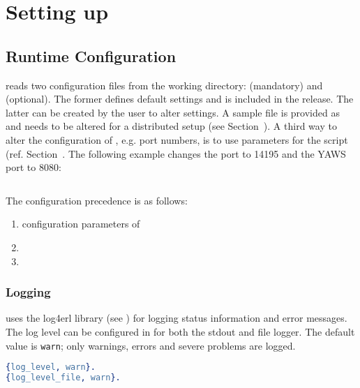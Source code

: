\chapter{Setting up \scalaris{}}
\label{chapter.runscalaris}

\section{Runtime Configuration}
\label{chapter.runscalaris.runtime_config}

\scalaris{} reads two configuration files from the working directory:
 (mandatory) and 
(optional). The former defines default settings and is included in the
release. The latter can be created by the user to alter settings.
A sample file is provided as 
and needs to be altered for a distributed setup (see
Section~).
A third way to alter the configuration of \scalaris{}, e.g. port numbers,
is to use parameters for the  script
(ref. Section~. The following
example changes the port to 14195 and the YAWS port to 8080:

\begin{lstlisting}[language=sh]
%> ./bin/scalarisctl -p 14194 -y 8080
\end{lstlisting}

The configuration precedence is as follows:
\begin{enumerate}
  \item configuration parameters of 
  \item {}
  \item {}
\end{enumerate}


\subsection{Logging}
\label{sec:logging}

\scalaris{} uses the log4erl library (see ) for
logging status information and error messages. The log level can be
configured in  for both the stdout and file logger.
The default value is {\tt warn}; only warnings, errors and severe problems are
logged.

\begin{lstlisting}[language=erlang]
%% @doc Loglevel: debug < info < warn < error < fatal < none
{log_level, warn}.
{log_level_file, warn}.
\end{lstlisting}

